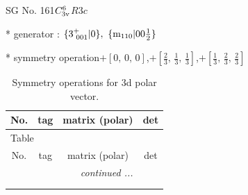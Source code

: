 \documentclass[fleqn,8pt]{jsarticle}
\begin{document}
\setcounter{MaxMatrixCols}{32}

\renewcommand{\tablename}{Table~}
\renewcommand{\figurename}{Figure~}
\begin{center}
\LARGE
SG No. 161\quad$C_{\rm 3v}^{6}$\quad$R3c$\quad[ trigonal ]
\end{center}

* generator : $\{3^{+}_{\,\,001}|0\},\,\,\{{\rm m}_{110}|0 0 \frac{1}{2}\}$

* symmetry operation\quad$+\left[ 0,\, 0,\, 0 \right]$,\quad $+\left[ \frac{2}{3},\, \frac{1}{3},\, \frac{1}{3} \right]$,\quad $+\left[ \frac{1}{3},\, \frac{2}{3},\, \frac{2}{3} \right]$
\renewcommand{\arraystretch}{1.3}
\begin{longtable}{cccc}
\caption{Symmetry operations for 3d polar vector.}
 \\
 \hline \hline
No. & tag & matrix (polar) & det \\ \hline \endfirsthead

\multicolumn{3}{l}{\tablename\ \thetable{}} \\
 \hline \hline
No. & tag & matrix (polar) & det \\ \hline \endhead

 \hline \hline
\multicolumn{3}{r}{\footnotesize\it continued ...} \\ \endfoot

 \hline \hline
\multicolumn{3}{r}{} \\ \endlastfoot


\end{longtable}
\end{document}
